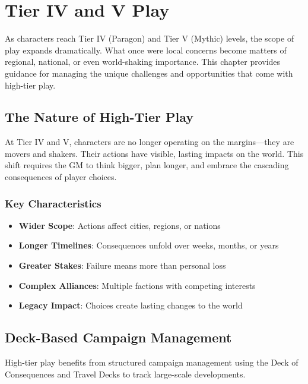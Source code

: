 \chapter{Tier IV and V Play}

As characters reach Tier IV (Paragon) and Tier V (Mythic) levels, the scope of play expands dramatically. What once were local concerns become matters of regional, national, or even world-shaking importance. This chapter provides guidance for managing the unique challenges and opportunities that come with high-tier play.

\section{The Nature of High-Tier Play}

At Tier IV and V, characters are no longer operating on the margins---they are movers and shakers. Their actions have visible, lasting impacts on the world. This shift requires the GM to think bigger, plan longer, and embrace the cascading consequences of player choices.

\subsection*{Key Characteristics}

\begin{itemize}
    \item \textbf{Wider Scope}: Actions affect cities, regions, or nations
    \item \textbf{Longer Timelines}: Consequences unfold over weeks, months, or years
    \item \textbf{Greater Stakes}: Failure means more than personal loss
    \item \textbf{Complex Alliances}: Multiple factions with competing interests
    \item \textbf{Legacy Impact}: Choices create lasting changes to the world
\end{itemize}

\section{Deck-Based Campaign Management}

High-tier play benefits from structured campaign management using the Deck of Consequences and Travel Decks to track large-scale developments.

